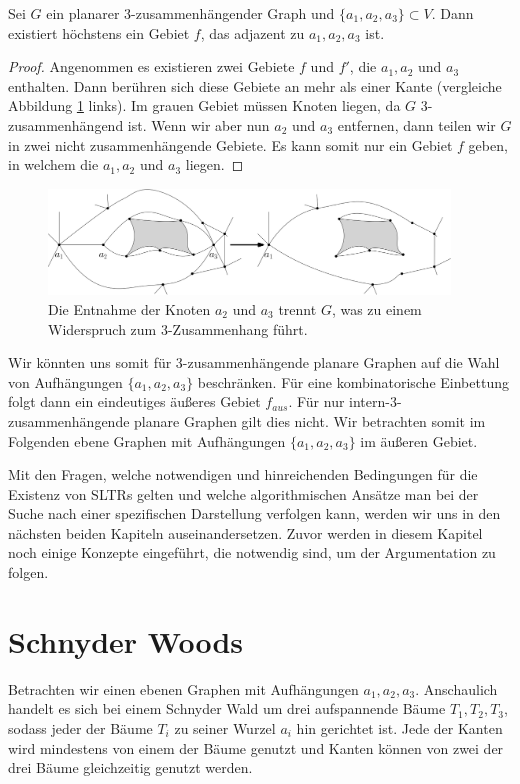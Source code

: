 \begin{proposition}
Sei $G$ ein planarer 3-zusammenhängender Graph und $\{a_1,a_2,a_3\} \subset V$. Dann existiert höchstens ein Gebiet $f$, das adjazent zu $a_1,a_2,a_3$ ist.
\end{proposition}

\begin{proof}
Angenommen es existieren zwei Gebiete $f$ und $f'$, die $a_1,a_2$ und $a_3$ enthalten. Dann berühren sich diese Gebiete an mehr als einer Kante (vergleiche Abbildung \ref{3_con_uni} links). Im grauen Gebiet müssen Knoten liegen, da $G$ 3-zusammenhängend ist. Wenn wir aber nun $a_2$ und $a_3$ entfernen, dann teilen wir $G$ in zwei nicht zusammenhängende Gebiete. Es kann somit nur ein Gebiet $f$ geben, in welchem die $a_1,a_2$ und $a_3$ liegen.
\end{proof}

\begin{figure}
	\centering
  \includegraphics[width=0.95\textwidth]{3_conn_uni.png}
	\caption{Die Entnahme der Knoten $a_2$ und $a_3$ trennt $G$, was zu einem Widerspruch zum 3-Zusammenhang führt.}
	\label{3_con_uni}
\end{figure}

\begin{remark}
Wir könnten uns somit für 3-zusammenhängende planare Graphen auf die Wahl von Aufhängungen $\{a_1,a_2,a_3\}$ beschränken. Für eine kombinatorische Einbettung folgt dann ein eindeutiges äußeres Gebiet $f_{aus}$. Für nur intern-3-zusammenhängende planare Graphen gilt dies nicht. Wir betrachten somit im Folgenden ebene Graphen mit Aufhängungen $\{a_1,a_2,a_3\}$ im äußeren Gebiet.
\end{remark}

Mit den Fragen, welche notwendigen und hinreichenden Bedingungen für die Existenz von SLTRs gelten und welche algorithmischen Ansätze man bei der Suche nach einer spezifischen Darstellung verfolgen kann, werden wir uns in den nächsten beiden Kapiteln auseinandersetzen. Zuvor werden in diesem Kapitel noch einige Konzepte eingeführt, die notwendig sind, um der Argumentation zu folgen.

\section{Schnyder Woods}\label{sw}
Betrachten wir einen ebenen Graphen mit Aufhängungen $a_1,a_2,a_3$. Anschaulich handelt es sich bei einem Schnyder Wald um drei aufspannende Bäume $T_1,T_2,T_3$, sodass jeder der Bäume $T_i$ zu seiner Wurzel $a_i$ hin gerichtet ist. Jede der Kanten wird mindestens von einem der Bäume genutzt und Kanten können von zwei der drei Bäume gleichzeitig genutzt werden.

